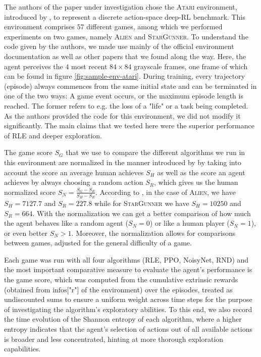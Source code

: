 \documentclass[10pt]{article} %
\begin{document}
The authors of the paper under investigation chose the \textsc{Atari} environment, introduced by \cite{atari-introduction}, to represent a discrete action-space deep-RL benchmark. This environment comprises $57$ different games, among which we performed experiments on two games, namely \textsc{Alien} and \textsc{StarGunner}. To understand the code given by the authors, we made use mainly of the official environment documentation as well as other papers that we found along the way. Here, the agent perceives the $4$ most recent $84\times84$ grayscale frames, one frame of which can be found in figure \ref{fig:sample-env-atari}. During training, every trajectory (episode) always commences from the same initial state and can be terminated in one of the two ways: A game event occurs, or the maximum episode length is reached. The former refers to e.g. the loss of a "life" or a task being completed. As the authors provided the code for this environment, we did not modify it significantly. The main claims that we tested here were the superior performance of RLE and deeper exploration.

\noindent The game score $S_{G}$ that we use to compare the different algorithms we run in this environment are normalized in the manner introduced by \cite{agent57} by taking into account the score an average human achieves $S_{H}$ as well as the score an agent achieves by always choosing a random action $S_{R}$, which gives us the human normalized score $S_{N} = \frac{S_{G} - S_{R}}{S_{H} - S_{R}}$. According to \cite{agent57}, in the case of \textsc{Alien}, we have $S_{H} = 7127.7$ and $S_{R} = 227.8$ while for \textsc{StarGunner} we have $S_{H} = 10250$ and $S_{R} = 664$. With the normalization we can get a better comparison of how much the agent behaves like a random agent ($S_{N} = 0$) or like a human player ($S_{N} = 1$), or even better $S_{N} > 1$. Moreover, the normalization allows for comparisons between games, adjusted for the general difficulty of a game.

\noindent Each game was run with all four algorithms (RLE, PPO, NoisyNet, RND) and the most important comparative measure to evaluate the agent's performance is the game score, which was computed from the cumulative extrinsic rewards (obtained from $\text{infos["r"]}$ of the environment) over the episodes, treated as undiscounted sums to ensure a uniform weight across time steps for the purpose of investigating the algorithm's exploratory abilities. To this end, we also record the time evolution of the Shannon entropy of each algorithm, where a higher entropy indicates that the agent's selection of actions out of all available actions is broader and less concentrated, hinting at more thorough exploration capabilities.
\end{document}
